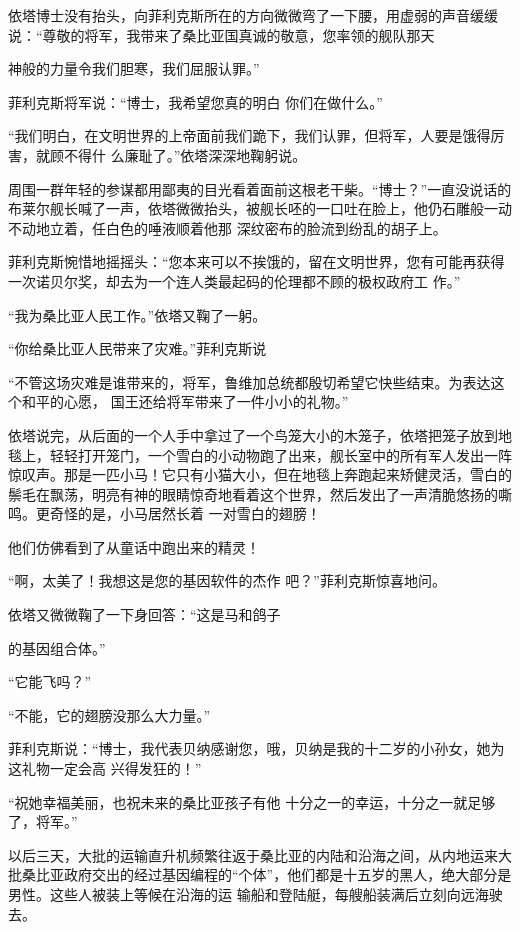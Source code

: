 \documentclass{article}
\begin{document}
依塔博士没有抬头，向菲利克斯所在的方向微微弯了一下腰，用虚弱的声音缓缓说：“尊敬的将军，我带来了桑比亚国真诚的敬意，您率领的舰队那天

\newpage
神般的力量令我们胆寒，我们屈服认罪。” 

菲利克斯将军说：“博士，我希望您真的明白
你们在做什么。” 

“我们明白，在文明世界的上帝面前我们跪下，我们认罪，但将军，人要是饿得厉害，就顾不得什
么廉耻了。”依塔深深地鞠躬说。 

周围一群年轻的参谋都用鄙夷的目光看着面前这根老干柴。“博士？”一直没说话的布莱尔舰长喊了一声，依塔微微抬头，被舰长呸的一口吐在脸上，他仍石雕般一动不动地立着，任白色的唾液顺着他那
深纹密布的脸流到纷乱的胡子上。 

菲利克斯惋惜地摇摇头：“您本来可以不挨饿的，留在文明世界，您有可能再获得一次诺贝尔奖，却去为一个连人类最起码的伦理都不顾的极权政府工
作。” 

“我为桑比亚人民工作。”依塔又鞠了一躬。

\newpage

“你给桑比亚人民带来了灾难。”菲利克斯说

“不管这场灾难是谁带来的，将军，鲁维加总统都殷切希望它快些结束。为表达这个和平的心愿，
国王还给将军带来了一件小小的礼物。” 

依塔说完，从后面的一个人手中拿过了一个鸟笼大小的木笼子，依塔把笼子放到地毯上，轻轻打开笼门，一个雪白的小动物跑了出来，舰长室中的所有军人发出一阵惊叹声。那是一匹小马！它只有小猫大小，但在地毯上奔跑起来矫健灵活，雪白的鬃毛在飘荡，明亮有神的眼睛惊奇地看着这个世界，然后发出了一声清脆悠扬的嘶鸣。更奇怪的是，小马居然长着
一对雪白的翅膀！ 


他们仿佛看到了从童话中跑出来的精灵！ 

“啊，太美了！我想这是您的基因软件的杰作
吧？”菲利克斯惊喜地问。 

依塔又微微鞠了一下身回答：“这是马和鸽子
\newpage

的基因组合体。” 


“它能飞吗？” 


“不能，它的翅膀没那么大力量。” 

菲利克斯说：“博士，我代表贝纳感谢您，哦，贝纳是我的十二岁的小孙女，她为这礼物一定会高
兴得发狂的！” 

“祝她幸福美丽，也祝未来的桑比亚孩子有他
十分之一的幸运，十分之一就足够了，将军。” 

以后三天，大批的运输直升机频繁往返于桑比亚的内陆和沿海之间，从内地运来大批桑比亚政府交出的经过基因编程的“个体”，他们都是十五岁的黑人，绝大部分是男性。这些人被装上等候在沿海的运
输船和登陆艇，每艘船装满后立刻向远海驶去。 
\end{document}
